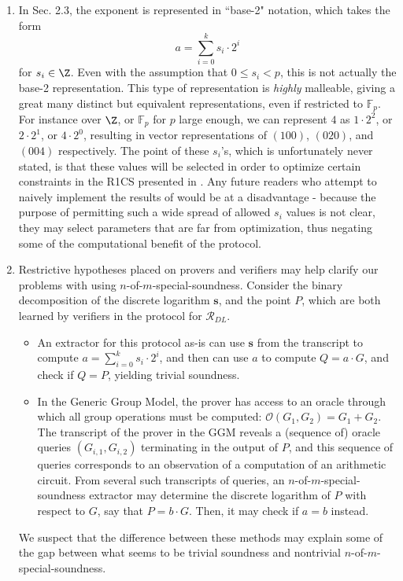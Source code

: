 \documentclass{article}
\theoremstyle{definition}
\newcommand{\Fp}{\mathbb{F}_p}
\newcommand{\6}{\mathbf}
\newcommand{\7}{\mathcal}
\begin{document}
\begin{enumerate}
    \item In Sec. 2.3, the exponent is represented in ``base-2" notation, which takes the form 
    $$a = \sum_{i=0}^k s_i \cdot 2^i$$
    for $s_i \in \Z$. Even with the assumption that $0 \leq s_i < p$, this is not actually the base-2 representation. This type of representation is \textit{highly} malleable, giving a great many distinct but equivalent representations, even if restricted to $\Fp$. For instance over $\Z$, or $\Fp$ for $p$ large enough, we can represent $4$ as $1 \cdot 2^2$, or $2 \cdot 2^1$, or $4 \cdot 2^0$, resulting in vector representations of $(100)$, $(020)$, and $(004)$ respectively. The point of these $s_i$'s, which is unfortunately never stated, is that these values will be selected in order to optimize certain constraints in the R1CS presented in \cite{KayabaR1CS}. Any future readers who attempt to naively implement the results of \cite{Eagen22} would be at a disadvantage - because the purpose of permitting such a wide spread of allowed $s_i$ values is not clear, they may select parameters that are far from optimization, thus negating some of the computational benefit of the protocol.


    \item Restrictive hypotheses placed on provers and verifiers may help clarify our problems with using $n$-of-$m$-special-soundness. Consider the binary decomposition of the discrete logarithm $\6s$, and the point $P$, which are both learned by verifiers in the protocol for $\mathcal{R}_{DL}$. 
    \begin{itemize}
    \item An extractor for this protocol as-is can use $\6s$ from the transcript to compute $a = \sum_{i=0}^k s_i \cdot 2^i$, and then can use $a$ to compute $Q = a \cdot G$, and check if $Q = P$, yielding trivial soundness.
    \item In the Generic Group Model, the prover has access to an oracle through which all group operations must be computed: $\mathcal{O}(G_1, G_2) = G_1 + G_2$. The transcript of the prover in the GGM reveals a (sequence of) oracle queries $(G_{i,1}, G_{i,2})$ terminating in the output of $P$, and this sequence of queries corresponds to an observation of a computation of an arithmetic circuit. From several such transcripts of queries, an $n$-of-$m$-special-soundness extractor may determine the discrete logarithm of $P$ with respect to $G$, say that $P = b \cdot G$. Then, it may check if $a = b$ instead. 
    \end{itemize}
    We suspect that the difference between these methods may explain some of the gap between what seems to be trivial soundness and nontrivial $n$-of-$m$-special-soundness. 


\end{enumerate}
\end{document}
